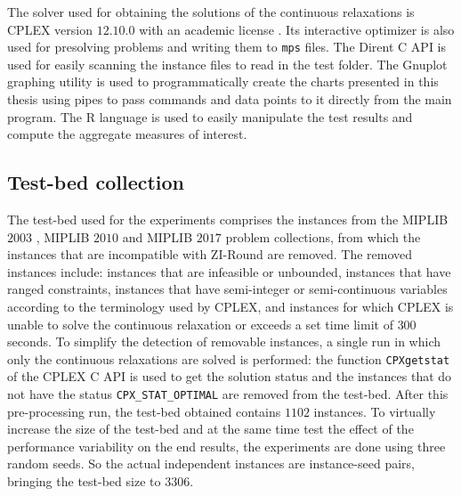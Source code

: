 \documentclass[a4paper,12pt]{book}
\begin{document}
The solver used for obtaining the solutions of the continuous relaxations is CPLEX version $12$.$10$.$0$ with an academic license \cite{cplex}. Its interactive optimizer is also used for presolving problems and writing them to \texttt{mps} files.
The Dirent C API \cite{dirent} is used for easily scanning the instance files to read in the test folder.
The Gnuplot \cite{gnuplot} graphing utility is used to programmatically create the charts presented in this thesis using pipes to pass commands and data points to it directly from the main program.
The R language \cite{rlang} is used to easily manipulate the test results and compute the aggregate measures of interest.

\subsection{Test-bed collection}

The test-bed used for the experiments comprises the instances from the MIPLIB $2003$ \cite{miplib2003}, MIPLIB $2010$ \cite{miplib2010} and MIPLIB $2017$ \cite{miplib2017} problem collections, from which the instances that are incompatible with ZI-Round are removed.
The removed instances include: instances that are infeasible or unbounded, instances that have ranged constraints, instances that have semi-integer or semi-continuous variables according to the terminology used by CPLEX, and instances for which CPLEX is unable to solve the continuous relaxation or exceeds a set time limit of $300$ seconds. To simplify the detection of removable instances, a single run in which only the continuous relaxations are solved is performed: the function \texttt{CPXgetstat} of the CPLEX C API is used to get the solution status and the instances that do not have the status \texttt{CPX\_STAT\_OPTIMAL} are removed from the test-bed. After this pre-processing run, the test-bed obtained contains $1102$ instances.
To virtually increase the size of the test-bed and at the same time test the effect of the performance variability on the end results, the experiments are done using three random seeds. So the actual independent instances are instance-seed pairs, bringing the test-bed size to $3306$. \par 
\end{document}
